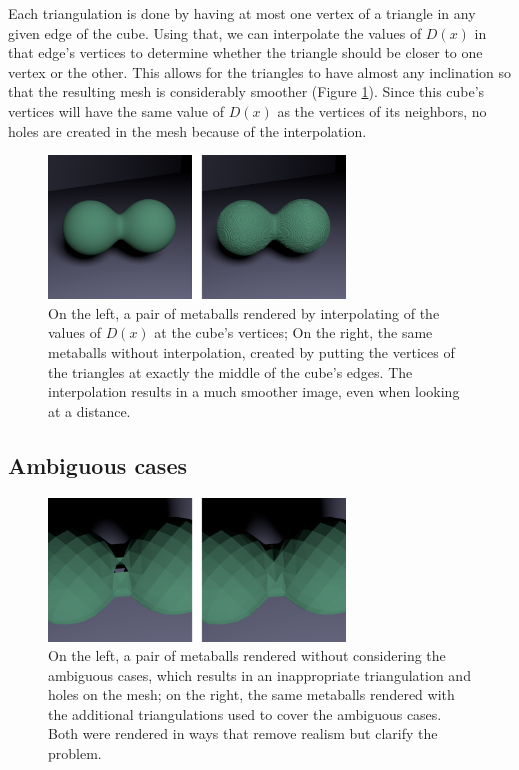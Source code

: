 \documentclass[conference]{acmsiggraph}
\begin{document}
Each triangulation is done by having at most one vertex of a triangle in any given edge of the cube. Using that, we can interpolate the values of $D(x)$ in that edge's vertices to determine whether the triangle should be closer to one vertex or the other. This allows for the triangles to have almost any inclination so that the resulting mesh is considerably smoother (Figure \ref{img:interpolation}). Since this cube's vertices will have the same value of $D(x)$ as the vertices of its neighbors, no holes are created in the mesh because of the interpolation.

\begin{figure}[ht]
  \centering
  \includegraphics[height=1.5in]{images/metaball-interpolation-comparison}
  \caption{On the left, a pair of metaballs rendered by interpolating of the values of $D(x)$ at the cube's vertices; On the right, the same metaballs without interpolation, created by putting the vertices of the triangles at exactly the middle of the cube's edges. The interpolation results in a much smoother image, even when looking at a distance.}
  \label{img:interpolation}
\end{figure}


\subsection{Ambiguous cases}

\begin{figure}[ht]
  \centering
  \includegraphics[height=1.5in]{images/metaball-bad1-comparison}
  \caption{On the left, a pair of metaballs rendered without considering the ambiguous cases, which results in an inappropriate triangulation and holes on the mesh; on the right, the same metaballs rendered with the additional triangulations used to cover the ambiguous cases. Both were rendered in ways that remove realism but clarify the problem.}
  \label{img:interpolation-comparison}
\end{figure}
\end{document}
